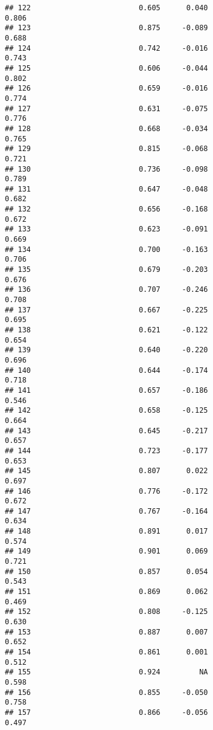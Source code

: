 \documentclass[
]{article}
\begin{document}
\begin{verbatim}
## 122                         0.605      0.040                     0.806
## 123                         0.875     -0.089                     0.688
## 124                         0.742     -0.016                     0.743
## 125                         0.606     -0.044                     0.802
## 126                         0.659     -0.016                     0.774
## 127                         0.631     -0.075                     0.776
## 128                         0.668     -0.034                     0.765
## 129                         0.815     -0.068                     0.721
## 130                         0.736     -0.098                     0.789
## 131                         0.647     -0.048                     0.682
## 132                         0.656     -0.168                     0.672
## 133                         0.623     -0.091                     0.669
## 134                         0.700     -0.163                     0.706
## 135                         0.679     -0.203                     0.676
## 136                         0.707     -0.246                     0.708
## 137                         0.667     -0.225                     0.695
## 138                         0.621     -0.122                     0.654
## 139                         0.640     -0.220                     0.696
## 140                         0.644     -0.174                     0.718
## 141                         0.657     -0.186                     0.546
## 142                         0.658     -0.125                     0.664
## 143                         0.645     -0.217                     0.657
## 144                         0.723     -0.177                     0.653
## 145                         0.807      0.022                     0.697
## 146                         0.776     -0.172                     0.672
## 147                         0.767     -0.164                     0.634
## 148                         0.891      0.017                     0.574
## 149                         0.901      0.069                     0.721
## 150                         0.857      0.054                     0.543
## 151                         0.869      0.062                     0.469
## 152                         0.808     -0.125                     0.630
## 153                         0.887      0.007                     0.652
## 154                         0.861      0.001                     0.512
## 155                         0.924         NA                     0.598
## 156                         0.855     -0.050                     0.758
## 157                         0.866     -0.056                     0.497

\end{verbatim}
\end{document}
